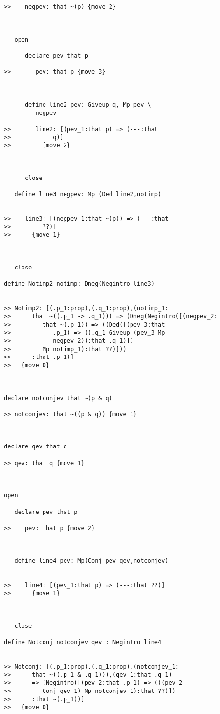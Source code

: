 \documentclass[12pt]{article}
\begin{document}
\begin{verbatim}
>>    negpev: that ~(p) {move 2}



   open

      declare pev that p

>>       pev: that p {move 3}



      define line2 pev: Giveup q, Mp pev \
         negpev

>>       line2: [(pev_1:that p) => (---:that
>>            q)]
>>         {move 2}



      close

   define line3 negpev: Mp (Ded line2,notimp)


>>    line3: [(negpev_1:that ~(p)) => (---:that
>>         ??)]
>>      {move 1}



   close

define Notimp2 notimp: Dneg(Negintro line3)


>> Notimp2: [(.p_1:prop),(.q_1:prop),(notimp_1:
>>      that ~((.p_1 -> .q_1))) => (Dneg(Negintro([(negpev_2:
>>         that ~(.p_1)) => ((Ded([(pev_3:that
>>            .p_1) => ((.q_1 Giveup (pev_3 Mp
>>            negpev_2)):that .q_1)])
>>         Mp notimp_1):that ??)]))
>>      :that .p_1)]
>>   {move 0}



declare notconjev that ~(p & q)

>> notconjev: that ~((p & q)) {move 1}



declare qev that q

>> qev: that q {move 1}



open

   declare pev that p

>>    pev: that p {move 2}



   define line4 pev: Mp(Conj pev qev,notconjev)


>>    line4: [(pev_1:that p) => (---:that ??)]
>>      {move 1}



   close

define Notconj notconjev qev : Negintro line4


>> Notconj: [(.p_1:prop),(.q_1:prop),(notconjev_1:
>>      that ~((.p_1 & .q_1))),(qev_1:that .q_1)
>>      => (Negintro([(pev_2:that .p_1) => (((pev_2
>>         Conj qev_1) Mp notconjev_1):that ??)])
>>      :that ~(.p_1))]
>>   {move 0}


\end{verbatim}
\end{document}
